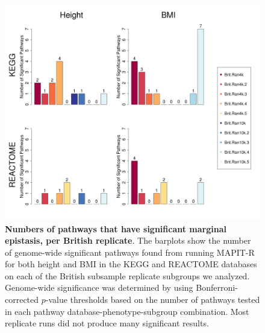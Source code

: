\clearpage
\setlength{\footskip}{1cm}

\begin{figure}[htbp]
\centering
\hspace*{-1.75cm}
\includegraphics[scale=.45]{Images/Supp/InterPath_Supp_Figure_BritReps_Barplot_vs4.png}
\caption[TBD]{\textbf{Numbers of pathways that have significant marginal epistasis, per British replicate}. The barplots show the number of genome-wide significant pathways found from running MAPIT-R for both height and BMI in the KEGG and REACTOME databases on each of the British subsample replicate subgroups we analyzed. Genome-wide significance was determined by using Bonferroni-corrected $p$-value thresholds based on the number of pathways tested in each pathway database-phenotype-subgroup combination. Most replicate runs did not produce many significant results.}
\label{InterPath-Supp-Figure-BritReps-Barplots}
\end{figure}
\clearpage

